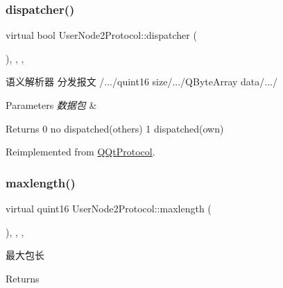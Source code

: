 \subsubsection{\texorpdfstring{dispatcher()}{dispatcher()}}
{\footnotesize\ttfamily virtual bool User\+Node2\+Protocol\+::dispatcher (\begin{DoxyParamCaption}\item[{const Q\+Byte\+Array \&}]{ }\end{DoxyParamCaption})\hspace{0.3cm}{\ttfamily [inline]}, {\ttfamily [override]}, {\ttfamily [protected]}, {\ttfamily [virtual]}}



语义解析器 分发报文 /.../quint16 size/.../\+Q\+Byte\+Array data/.../ 


\begin{DoxyParams}{Parameters}
{\em 数据包} & \\
\hline
\end{DoxyParams}
\begin{DoxyReturn}{Returns}
0 no dispatched(others) 1 dispatched(own) 
\end{DoxyReturn}


Reimplemented from \mbox{\hyperlink{class_q_qt_protocol_a35a69c4b89c8cf7459038f40d75e0dc9}{Q\+Qt\+Protocol}}.

\mbox{\label{class_user_node2_protocol_a79735a944102084e4b2da6c8cd6f598f}} 
\subsubsection{\texorpdfstring{maxlength()}{maxlength()}}
{\footnotesize\ttfamily virtual quint16 User\+Node2\+Protocol\+::maxlength (\begin{DoxyParamCaption}{ }\end{DoxyParamCaption})\hspace{0.3cm}{\ttfamily [inline]}, {\ttfamily [override]}, {\ttfamily [protected]}, {\ttfamily [virtual]}}



最大包长 

\begin{DoxyReturn}{Returns}

\end{DoxyReturn}


